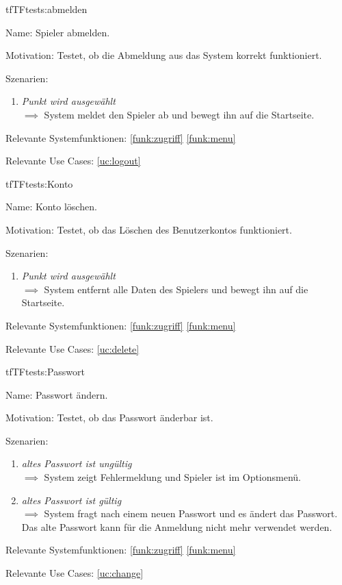 \begin{description}[leftmargin=5em, style=sameline]
\begin{lhp}{tf}{TF}{tests:abmelden}
	\item [Name:] Spieler abmelden.
	\item [Motivation:] Testet, ob die Abmeldung aus das System korrekt funktioniert.
	\item [Szenarien:] \hfill
		\begin{enumerate}
			\item \textit{Punkt wird ausgewählt} \\ $\implies$ System meldet den Spieler ab und bewegt ihn auf die Startseite.
		\end{enumerate}
	\item [Relevante Systemfunktionen:] \ref{funk:zugriff} \ref{funk:menu}
	\item [Relevante Use Cases:] \ref{uc:logout}
	
\end{lhp}

\begin{lhp}{tf}{TF}{tests:Konto}
	\item [Name:] Konto löschen.
	\item [Motivation:] Testet, ob das Löschen des Benutzerkontos funktioniert.
	\item [Szenarien:] \hfill
		\begin{enumerate}
			\item \textit{Punkt wird ausgewählt} \\ $\implies$ System entfernt alle Daten des Spielers und bewegt ihn auf die Startseite.
		\end{enumerate}
	\item [Relevante Systemfunktionen:] \ref{funk:zugriff} \ref{funk:menu}
	\item [Relevante Use Cases:] \ref{uc:delete}
\end{lhp}

\begin{lhp}{tf}{TF}{tests:Passwort}
	\item [Name:] Passwort ändern.
	\item [Motivation:] Testet, ob das Passwort änderbar ist.
	\item [Szenarien:] \hfill
		\begin{enumerate}
			\item \textit{altes Passwort ist ungültig} \\ $\implies$ System zeigt Fehlermeldung und Spieler ist im Optionsmenü.
			\item \textit{altes Passwort ist gültig } \\ $\implies$ System fragt nach einem neuen Passwort und es ändert das Passwort. Das alte Passwort kann für die Anmeldung nicht mehr verwendet werden.
		\end{enumerate}
	\item [Relevante Systemfunktionen:] \ref{funk:zugriff} \ref{funk:menu}
	\item [Relevante Use Cases:] \ref{uc:change}	
	\end{lhp}


\end{description}
